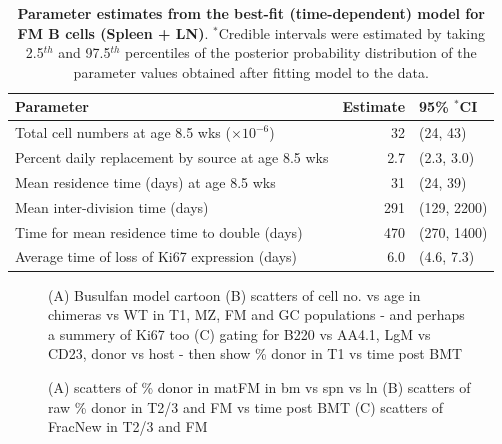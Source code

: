 \documentclass[11pt,onecolumn]{article}
\begin{document}
	\vspace{1cm}
	
	
	\begin{table}[h!]
		\begin{center}
			\renewcommand{\arraystretch}{1.25}
			\begin{tabular}{ l r l } 
				\toprule 
				\textbf{Parameter}  &  {\small Estimate}  &  {\small 95\%  $^{\ast}$CI} \\ 
				\toprule
				Total cell numbers at age 8.5 wks ($\times 10^{-6}$)      & 32       &  (24, 43)  \\ 
				Percent daily replacement by source at age 8.5 wks        & 2.7      &  (2.3, 3.0)  \\
				Mean residence time (days) at age 8.5 wks                 & 31       &  (24, 39)  \\ 
				Mean inter-division time (days)                           & 291      &  (129, 2200)  \\
				Time for mean residence time to double (days)             & 470      &  (270, 1400)  \\
				Average time of loss of Ki67 expression (days)            & 6.0      &  (4.6, 7.3)  \\
				\hline
				\toprule 
			\end{tabular}
		\end{center}
		\caption{\small \textbf{Parameter estimates from the best-fit (time-dependent) model for FM B cells (Spleen + LN)}. $^{\ast}$Credible intervals were estimated by taking 2.5$^{th}$ and 97.5$^{th}$ percentiles of the posterior probability distribution of the parameter values obtained after fitting model to the data.}
		\label{tab:FM-parestm}
	\end{table} 


\begin{figure}[htbp] %
   \centering
   \caption{(A) Busulfan model cartoon (B) scatters of cell no. vs age in chimeras vs WT in T1, MZ, FM and GC populations - and perhaps a summery of Ki67 too (C) gating for B220 vs AA4.1, LgM vs CD23, donor vs host - then show \% donor in T1 vs time post BMT }
   \label{fig:Model_validation}
\end{figure}


\begin{figure}[htbp] %
   \centering
   \caption{(A) scatters of \% donor in matFM in bm vs spn vs ln (B) scatters of raw \% donor in T2/3 and FM vs time post BMT (C) scatters of FracNew in T2/3 and FM }
   \label{fig:Raw_FMplots}
\end{figure}
\end{document}
